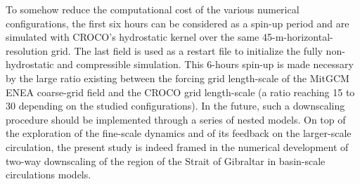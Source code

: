 To somehow reduce the computational cost of the various numerical configurations, the first six hours can be considered as a spin-up period and are simulated with CROCO's hydrostatic kernel over the same 45-m-horizontal-resolution grid. The last field is used as a restart file to initialize the fully non-hydrostatic and compressible simulation. This 6-hours spin-up is made necessary by the large ratio existing between the forcing grid length-scale of the MitGCM ENEA coarse-grid field and the CROCO grid length-scale (a ratio reaching 15 to 30 depending on the studied configurations). In the future, such a downscaling procedure should be implemented through a series of nested models. On top of the exploration of the fine-scale dynamics and of its feedback on the larger-scale circulation, the present study is indeed framed in the numerical development of two-way downscaling of the region of the Strait of Gibraltar in basin-scale circulations models.

